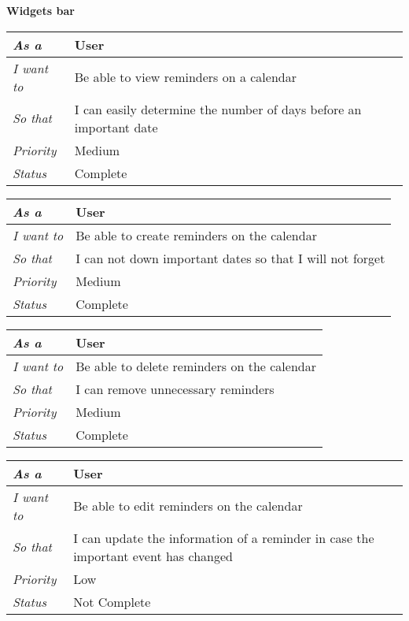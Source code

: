 \FloatBarrier
\textbf{Widgets bar}
\FloatBarrier
\begin{table}[h!]
    \begin{tabular}{|l|l|}
        \hline
        \textit{As a} & User \\ \hline
        \textit{I want to} & Be able to view reminders on a calendar \\ \hline
        \textit{So that} & I can easily determine the number of days before an important date \\ \hline
        \textit{Priority} & {\color[HTML]{FE996B} Medium} \\ \hline
        \textit{Status} & Complete \\ \hline
    \end{tabular}
\end{table}

\begin{table}[h!]
    \begin{tabular}{|l|l|}
        \hline
        \textit{As a} & User \\ \hline
        \textit{I want to} & Be able to create reminders on the calendar \\ \hline
        \textit{So that} & I can not down important dates so that I will not forget \\ \hline
        \textit{Priority} & {\color[HTML]{FE996B} Medium} \\ \hline
        \textit{Status} & Complete \\ \hline
    \end{tabular}
\end{table}

\begin{table}[h!]
    \begin{tabular}{|l|l|}
        \hline
        \textit{As a} & User \\ \hline
        \textit{I want to} & Be able to delete reminders on the calendar \\ \hline
        \textit{So that} & I can remove unnecessary reminders \\ \hline
        \textit{Priority} & {\color[HTML]{FE996B} Medium} \\ \hline
        \textit{Status} & Complete \\ \hline
    \end{tabular}
\end{table}

\begin{table}[h!]
    \begin{tabular}{|l|l|}
        \hline
        \textit{As a} & User \\ \hline
        \textit{I want to} & Be able to edit reminders on the calendar \\ \hline
        \textit{So that} & I can update the information of a reminder in case the important event has changed \\ \hline
        \textit{Priority} & {\color[HTML]{3166FF} Low} \\ \hline
        \textit{Status} & Not Complete \\ \hline
    \end{tabular}
\end{table}

